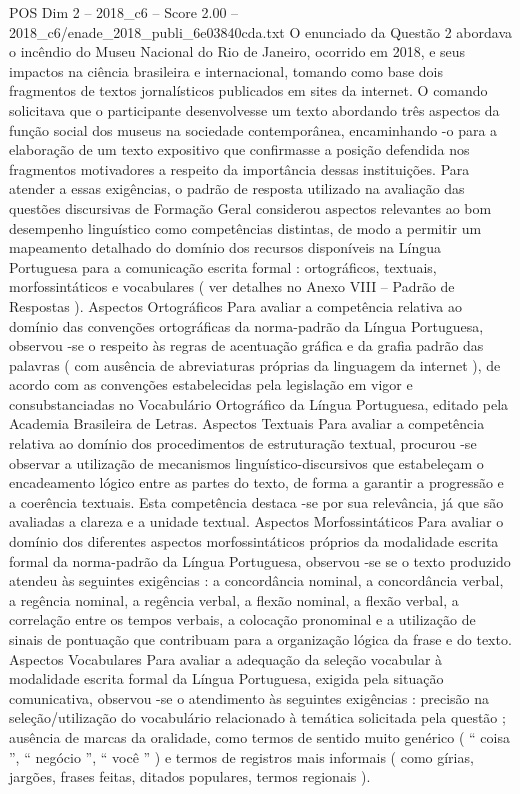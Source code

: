 \begin{textsample}{POS Dim 2 – 2018\_c6 – Score 2.00 – 2018\_c6/enade\_2018\_publi\_6e03840cda.txt}
O enunciado da Questão 2 abordava o incêndio do Museu Nacional do Rio de Janeiro, ocorrido em 2018, e seus impactos na ciência brasileira e internacional, tomando como base dois fragmentos de textos jornalísticos publicados em sites da internet.
O comando solicitava que o participante desenvolvesse um texto abordando três aspectos da função social dos museus na sociedade contemporânea, encaminhando -o para a elaboração de um texto expositivo que confirmasse a posição defendida nos fragmentos motivadores a respeito da importância dessas instituições.
Para atender a essas exigências, o padrão de resposta utilizado na avaliação das questões discursivas de Formação Geral considerou aspectos relevantes ao bom desempenho linguístico como competências distintas, de modo a permitir um mapeamento detalhado do domínio dos recursos disponíveis na Língua Portuguesa para a comunicação escrita formal : ortográficos, textuais, morfossintáticos e vocabulares ( ver detalhes no Anexo VIII – Padrão de Respostas ).
Aspectos Ortográficos Para avaliar a competência relativa ao domínio das convenções ortográficas da norma-padrão da Língua Portuguesa, observou -se o respeito às regras de acentuação gráfica e da grafia padrão das palavras ( com ausência de abreviaturas próprias da linguagem da internet ), de acordo com as convenções estabelecidas pela legislação em vigor e consubstanciadas no Vocabulário Ortográfico da Língua Portuguesa, editado pela Academia Brasileira de Letras.
Aspectos Textuais Para avaliar a competência relativa ao domínio dos procedimentos de estruturação textual, procurou -se observar a utilização de mecanismos linguístico-discursivos que estabeleçam o encadeamento lógico entre as partes do texto, de forma a garantir a progressão e a coerência textuais.
Esta competência destaca -se por sua relevância, já que são avaliadas a clareza e a unidade textual.
Aspectos Morfossintáticos Para avaliar o domínio dos diferentes aspectos morfossintáticos próprios da modalidade escrita formal da norma-padrão da Língua Portuguesa, observou -se se o texto produzido atendeu às seguintes exigências : a concordância nominal, a concordância verbal, a regência nominal, a regência verbal, a flexão nominal, a flexão verbal, a correlação entre os tempos verbais, a colocação pronominal e a utilização de sinais de pontuação que contribuam para a organização lógica da frase e do texto.
Aspectos Vocabulares Para avaliar a adequação da seleção vocabular à modalidade escrita formal da Língua Portuguesa, exigida pela situação comunicativa, observou -se o atendimento às seguintes exigências : precisão na seleção/utilização do vocabulário relacionado à temática solicitada pela questão ; ausência de marcas da oralidade, como termos de sentido muito genérico ( “ coisa ”, “ negócio ”, “ você ” ) e termos de registros mais informais ( como gírias, jargões, frases feitas, ditados populares, termos regionais ).

\end{textsample}
